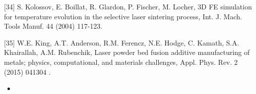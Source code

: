 \documentclass[10pt]{article}
\begin{document}
[34] S. Kolossov, E. Boillat, R. Glardon, P. Fischer, M. Locher, 3D FE simulation for temperature evolution in the selective laser sintering process, Int. J. Mach. Tools Manuf. 44 (2004) 117-123.

[35] W.E. King, A.T. Anderson, R.M. Ferencz, N.E. Hodge, C. Kamath, S.A. Khairallah, A.M. Rubenchik, Laser powder bed fusion additive manufacturing of metals; physics, computational, and materials challenges, Appl. Phys. Rev. 2 (2015) 041304 .

\begin{itemize}
  \item 
\end{itemize}
\end{document}
